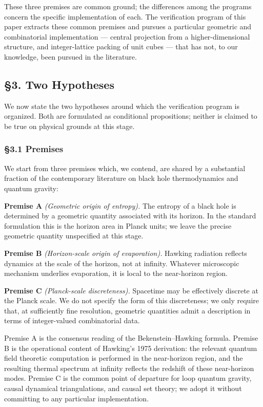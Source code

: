 \documentclass[a4paper,11pt]{article}
\theoremstyle{definition}
\begin{document}
These three premises are common ground; the differences among the
programs concern the specific implementation of each. The verification
program of this paper extracts these common premises and pursues a
particular geometric and combinatorial implementation --- central
projection from a higher-dimensional structure, and integer-lattice
packing of unit cubes --- that has not, to our knowledge, been pursued
in the literature.

\subsection{§3. Two Hypotheses}\label{two-hypotheses}

We now state the two hypotheses around which the verification program is
organized. Both are formulated as conditional propositions; neither is
claimed to be true on physical grounds at this stage.

\subsubsection{§3.1 Premises}\label{premises}

We start from three premises which, we contend, are shared by a
substantial fraction of the contemporary literature on black hole
thermodynamics and quantum gravity:

\textbf{Premise A} \emph{(Geometric origin of entropy).} The entropy of
a black hole is determined by a geometric quantity associated with its
horizon. In the standard formulation this is the horizon area in Planck
units; we leave the precise geometric quantity unspecified at this
stage.

\textbf{Premise B} \emph{(Horizon-scale origin of evaporation).} Hawking
radiation reflects dynamics at the scale of the horizon, not at
infinity. Whatever microscopic mechanism underlies evaporation, it is
local to the near-horizon region.

\textbf{Premise C} \emph{(Planck-scale discreteness).} Spacetime may be
effectively discrete at the Planck scale. We do not specify the form of
this discreteness; we only require that, at sufficiently fine
resolution, geometric quantities admit a description in terms of
integer-valued combinatorial data.

Premise A is the consensus reading of the Bekenstein--Hawking formula.
Premise B is the operational content of Hawking's 1975 derivation: the
relevant quantum field theoretic computation is performed in the
near-horizon region, and the resulting thermal spectrum at infinity
reflects the redshift of these near-horizon modes. Premise C is the
common point of departure for loop quantum gravity, causal dynamical
triangulations, and causal set theory; we adopt it without committing to
any particular implementation.
\end{document}
